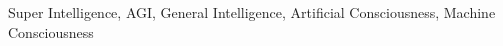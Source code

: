 \documentclass[conference]{IEEEtran}
\begin{document}
\begin{IEEEkeywords}
Super Intelligence, AGI, General Intelligence, Artificial Consciousness, Machine Consciousness
\end{IEEEkeywords}














\vspace{12pt}
\color{red}
\end{document}
